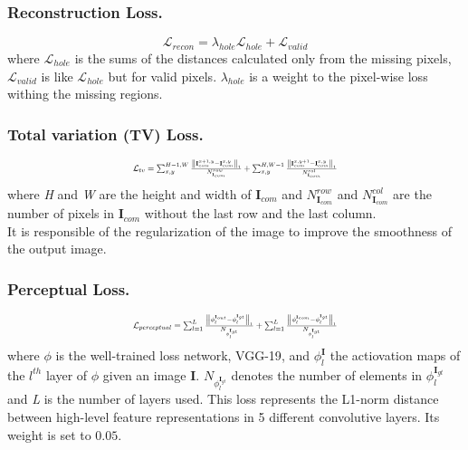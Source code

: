 \documentclass[10pt,twocolumn,letterpaper]{article}
\newcommand\norm[1]{\left\lVert#1\right\rVert}
\begin{document}
\subsubsection{Reconstruction Loss.}
\begin{equation}
    \mathcal{L}_{recon} = \lambda_{hole} \mathcal{L}_{hole} + \mathcal{L}_{valid}
\end{equation}
where \(\mathcal{L}_{hole}\) is the sums of the distances calculated only from the missing pixels, \(\mathcal{L}_{valid}\) is like \(\mathcal{L}_{hole}\) but for valid pixels. \(\lambda_{hole}\) is a weight to the pixel-wise loss withing the missing regions.

\subsubsection{Total variation (TV) Loss.}
\begin{equation}
\resizebox{.47 \textwidth}{!}{%
    $\mathcal{L}_{tv} = \sum^{H-1,W}_{x,y} \frac{\norm{ \mathbf{I}^{x+1,y}_{com} - \mathbf{I}^{x,y}_{com} }_1}{N^{row}_{\mathbf{I}_{com}}} + \sum^{H,W-1}_{x,y} \frac{\norm{ \mathbf{I}^{x,y+1}_{com} - \mathbf{I}^{x,y}_{com} }_1}{N^{col}_{\mathbf{I}_{com}}}$%
    }
\end{equation}
where \textit{H} and \textit{W} are the height and width of $\mathbf{I}_{com}$ and $N^{row}_{\mathbf{I}_{com}}$ and $N^{col}_{\mathbf{I}_{com}}$ are the number of pixels in $\mathbf{I}_{com}$ without the last row and the last column.
\\
It is responsible of the regularization of the image to improve the smoothness of the output image.

\subsubsection{Perceptual Loss.}
\begin{equation}
\resizebox{.47 \textwidth}{!}{%
    $\mathcal{L}_{perceptual} = \sum^L_{l=1} \frac{\norm{ \phi^{\mathbf{I}_{out}}_l - \phi^{\mathbf{I}_{gt}}_l }_1}{N_{\phi^{\mathbf{I}_{gt}}_l}} + \sum^L_{l=1} \frac{\norm{ \phi^{\mathbf{I}_{com}}_l - \phi^{\mathbf{I}_{gt}}_l }_1}{N_{\phi^{\mathbf{I}_{gt}}_l}}$%
    }
\end{equation}
where \(\phi\) is the well-trained loss network, VGG-19\cite{simonyan2014very}, and \(\phi^{\mathbf{I}}_l\) the actiovation maps of the \(l^{th}\) layer of \(\phi\) given an image \(\mathbf{I}\).
\(N_{\phi^{\mathbf{I}_{gt}}_l}\) denotes the number of elements in \(\phi^{\mathbf{I}_{gt}}_l\) and \textit{L} is the number of layers used.
This loss represents the L1-norm distance between high-level feature representations in 5 different convolutive layers. Its weight is set to \(0.05\).
\end{document}
